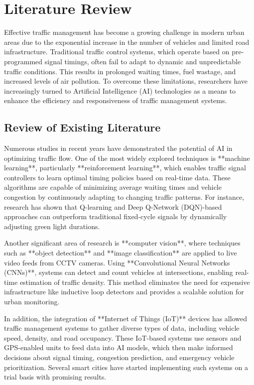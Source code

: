 \chapter{Literature Review}

Effective traffic management has become a growing challenge in modern urban areas due to the exponential increase in the number of vehicles and limited road infrastructure. Traditional traffic control systems, which operate based on pre-programmed signal timings, often fail to adapt to dynamic and unpredictable traffic conditions. This results in prolonged waiting times, fuel wastage, and increased levels of air pollution. To overcome these limitations, researchers have increasingly turned to Artificial Intelligence (AI) technologies as a means to enhance the efficiency and responsiveness of traffic management systems.

\section{Review of Existing Literature}

Numerous studies in recent years have demonstrated the potential of AI in optimizing traffic flow. One of the most widely explored techniques is **machine learning**, particularly **reinforcement learning**, which enables traffic signal controllers to learn optimal timing policies based on real-time data. These algorithms are capable of minimizing average waiting times and vehicle congestion by continuously adapting to changing traffic patterns. For instance, research has shown that Q-learning and Deep Q-Network (DQN)-based approaches can outperform traditional fixed-cycle signals by dynamically adjusting green light durations.

Another significant area of research is **computer vision**, where techniques such as **object detection** and **image classification** are applied to live video feeds from CCTV cameras. Using **Convolutional Neural Networks (CNNs)**, systems can detect and count vehicles at intersections, enabling real-time estimation of traffic density. This method eliminates the need for expensive infrastructure like inductive loop detectors and provides a scalable solution for urban monitoring.

In addition, the integration of **Internet of Things (IoT)** devices has allowed traffic management systems to gather diverse types of data, including vehicle speed, density, and road occupancy. These IoT-based systems use sensors and GPS-enabled units to feed data into AI models, which then make informed decisions about signal timing, congestion prediction, and emergency vehicle prioritization. Several smart cities have started implementing such systems on a trial basis with promising results.

